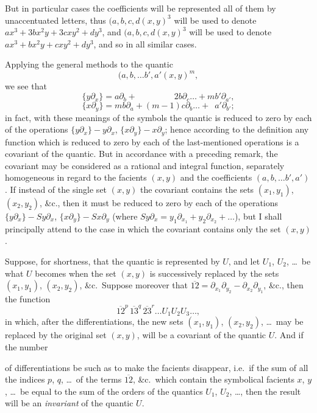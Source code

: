 \documentclass[11pt,a4paper]{book}
\begin{document}
\newpage
\setcounter{page}{230}

But in particular cases the coefficients will be represented all of them by unaccentuated letters, thus $(a, b, c, d \!\!\!\!(x, y)^3$ will be used to denote $ax^3 + 3bx^2y + 3cxy^2 + dy^3$, and $(a, b, c, d \!\!\!\!(x, y)^3$ will be used to denote $ax^3 + bx^2y + cxy^2 + dy^3$, and so in all similar cases.

Applying the general methods to the quantic
\[
(a, b, \ldots b', a' \!\!\!\!(x, y)^m,
\]
we see that
\[
\{y\partial_x\} = a\partial_b + \phantom{(m-1)} 2b\partial_c \ldots + mb'\partial_{a'},
\]
\[
\{x\partial_y\} = mb\partial_a + (m-1)c\partial_b \ldots + \phantom{2} a'\partial_{b'};
\]
in fact, with these meanings of the symbols the quantic is reduced to zero by each of the operations $\{y\partial_x\} - y\partial_x$, $\{x\partial_y\} - x\partial_y$; hence according to the definition any function which is reduced to zero by each of the last-mentioned operations is a covariant of the quantic. But in accordance with a preceding remark, the covariant may be considered as a rational and integral function, separately homogeneous in regard to the facients $(x, y)$ and the coefficients $(a, b, \ldots b', a')$. If instead of the single set $(x, y)$ the covariant contains the sets $(x_1, y_1)$, $(x_2, y_2)$, \&c., then it must be reduced to zero by each of the operations $\{y\partial_x\} - Sy\partial_x$, $\{x\partial_y\} - Sx\partial_y$ (where $Sy\partial_x = y_1\partial_{x_1} + y_2\partial_{x_2} + \ldots$), but I shall principally attend to the case in which the covariant contains only the set $(x, y)$.

Suppose, for shortness, that the quantic is represented by $U$, and let $U_1$, $U_2$, \ldots\ be what $U$ becomes when the set $(x, y)$ is successively replaced by the sets $(x_1, y_1)$, $(x_2, y_2)$, \&c.\ Suppose moreover that $\overline{12} = \partial_{x_1}\partial_{y_2} - \partial_{x_2}\partial_{y_1}$, \&c., then the function
\[
\overline{12}^p \, \overline{13}^q \, \overline{23}^r \ldots U_1 U_2 U_3 \ldots,
\]
in which, after the differentiations, the new sets $(x_1, y_1)$, $(x_2, y_2)$, \ldots\ may be replaced by the original set $(x, y)$, will be a covariant of the quantic $U$. And if the number

\newpage
\setcounter{page}{231}

of differentiations be such as to make the facients disappear, i.e.\ if the sum of all the indices $p$, $q$, \ldots\ of the terms $\overline{12}$, \&c.\ which contain the symbolical facients $x$, $y$, \ldots\ be equal to the sum of the orders of the quantics $U_1$, $U_2$, \ldots, then the result will be an \textit{invariant} of the quantic $U$.
\end{document}
